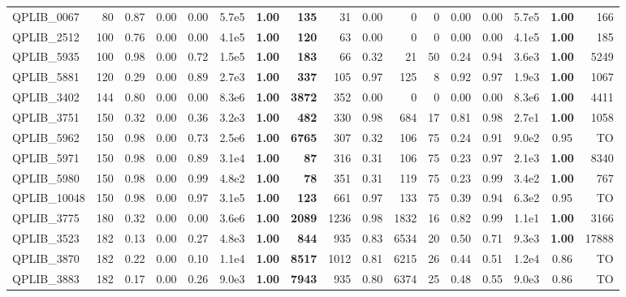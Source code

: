 \documentclass[twoside]{article}
\begin{document}
\begin{table}[h!]
{\begin{tabular}{lrcc|crcr|rcrrccrcr}
				QPLIB\_0067 & 80 & 0.87 & 0.00 & 0.00 & 5.7e5 & \textbf{1.00} & \textbf{135} & 31 & 0.00 & 0 & 0 & 0.00 & 0.00 & 5.7e5 & \textbf{1.00} & 166 \\
				QPLIB\_2512 & 100 & 0.76 & 0.00 & 0.00 & 4.1e5 & \textbf{1.00} & \textbf{120} & 63 & 0.00 & 0 & 0 & 0.00 & 0.00 & 4.1e5 & \textbf{1.00} & 185 \\
				QPLIB\_5935 & 100 & 0.98 & 0.00 & 0.72 & 1.5e5 & \textbf{1.00} & \textbf{183} & 66 & 0.32 & 21 & 50 & 0.24 & 0.94 & 3.6e3 & \textbf{1.00} & 5249 \\
				QPLIB\_5881 & 120 & 0.29 & 0.00 & 0.89 & 2.7e3 & \textbf{1.00} & \textbf{337} & 105 & 0.97 & 125 & 8 & 0.92 & 0.97 & 1.9e3 & \textbf{1.00} & 1067 \\
				QPLIB\_3402 & 144 & 0.80 & 0.00 & 0.00 & 8.3e6 & \textbf{1.00} & \textbf{3872} & 352 & 0.00 & 0 & 0 & 0.00 & 0.00 & 8.3e6 & \textbf{1.00} & 4411 \\
				QPLIB\_3751 & 150 & 0.32 & 0.00 & 0.36 & 3.2e3 & \textbf{1.00} & \textbf{482} & 330 & 0.98 & 684 & 17 & 0.81 & 0.98 & 2.7e1 & \textbf{1.00} & 1058 \\
				QPLIB\_5962 & 150 & 0.98 & 0.00 & 0.73 & 2.5e6 & \textbf{1.00} & \textbf{6765} & 307 & 0.32 & 106 & 75 & 0.24 & 0.91 & 9.0e2 & 0.95 & TO \\
				QPLIB\_5971 & 150 & 0.98 & 0.00 & 0.89 & 3.1e4 & \textbf{1.00} & \textbf{87} & 316 & 0.31 & 106 & 75 & 0.23 & 0.97 & 2.1e3 & \textbf{1.00} & 8340 \\
				QPLIB\_5980 & 150 & 0.98 & 0.00 & 0.99 & 4.8e2 & \textbf{1.00} & \textbf{78} & 351 & 0.31 & 119 & 75 & 0.23 & 0.99 & 3.4e2 & \textbf{1.00} & 767 \\
				QPLIB\_10048 & 150 & 0.98 & 0.00 & 0.97 & 3.1e5 & \textbf{1.00} & \textbf{123} & 661 & 0.97 & 133 & 75 & 0.39 & 0.94 & 6.3e2 & 0.95 & TO \\
				QPLIB\_3775 & 180 & 0.32 & 0.00 & 0.00 & 3.6e6 & \textbf{1.00} & \textbf{2089} & 1236 & 0.98 & 1832 & 16 & 0.82 & 0.99 & 1.1e1 & \textbf{1.00} & 3166 \\
				QPLIB\_3523 & 182 & 0.13 & 0.00 & 0.27 & 4.8e3 & \textbf{1.00} & \textbf{844} & 935 & 0.83 & 6534 & 20 & 0.50 & 0.71 & 9.3e3 & \textbf{1.00} & 17888 \\
				QPLIB\_3870 & 182 & 0.22 & 0.00 & 0.10 & 1.1e4 & \textbf{1.00} & \textbf{8517} & 1012 & 0.81 & 6215 & 26 & 0.44 & 0.51 & 1.2e4 & 0.86 & TO \\
				QPLIB\_3883 & 182 & 0.17 & 0.00 & 0.26 & 9.0e3 & \textbf{1.00} & \textbf{7943} & 935 & 0.80 & 6374 & 25 & 0.48 & 0.55 & 9.0e3 & 0.86 & TO \\

\end{tabular}}
\end{table}
\end{document}
